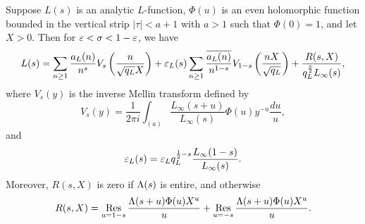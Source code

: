 \documentclass[12pt]{article}
\begin{document}
    \begin{theorem*}
      Suppose \(L(s)\) is an analytic \(L\)-function, \(\Phi(u)\) is an even holomorphic function bounded in the vertical strip \(|\tau| < a+1\) with \(a > 1\) such that \(\Phi(0) = 1\), and let \(X > 0\). Then for \(\varepsilon < \sigma < 1-\varepsilon\), we have
      \[
        L(s) = \sum_{n \ge 1}\frac{a_{L}(n)}{n^{s}}V_{s}\left(\frac{n}{\sqrt{q_{L}}X}\right)+\varepsilon_{L}(s)\sum_{n \ge 1}\frac{\overline{a_{L}(n)}}{n^{1-s}}V_{1-s}\left(\frac{nX}{\sqrt{q_{L}}}\right)+\frac{R(s,X)}{q_{L}^{\frac{s}{2}}L_{\infty}(s)},
      \]
      where \(V_{s}(y)\) is the inverse Mellin transform defined by
      \[
        V_{s}(y) = \frac{1}{2\pi i}\int_{(a)}\frac{L_{\infty}(s+u)}{L_{\infty}(s)}\Phi(u)y^{-u}\frac{du}{u},
      \]
      and
      \[
        \varepsilon_{L}(s) = \varepsilon_{L}q_{L}^{\frac{1}{2}-s}\frac{L_{\infty}(1-s)}{L_{\infty}(s)}.
      \]
      Moreover, \(R(s,X)\) is zero if \(\Lambda(s)\) is entire, and otherwise
      \[
        R(s,X) = \operatorname*{\mathrm{Res}}_{u = 1-s}\frac{\Lambda(s+u)\Phi(u)X^{u}}{u}+\operatorname*{\mathrm{Res}}_{u = -s}\frac{\Lambda(s+u)\Phi(u)X^{u}}{u}.
      \]
    \end{theorem*}
\end{document}
